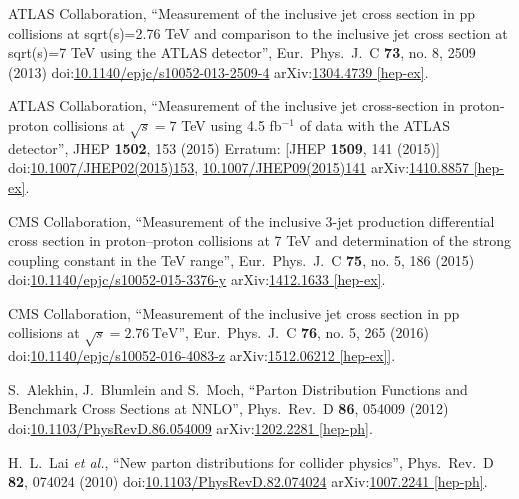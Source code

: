 \begin{thebibliography}{99}


ATLAS Collaboration, ``Measurement of the inclusive jet cross section in pp collisions at sqrt(s)=2.76 TeV and comparison to the inclusive jet cross section at sqrt(s)=7 TeV using the ATLAS detector'', Eur.\ Phys.\ J.\ C {\bf 73}, no. 8, 2509 (2013) doi:\href{http://dx.doi.org/10.1140/epjc/s10052-013-2509-4}{10.1140/epjc/s10052-013-2509-4} arXiv:\href{https://arxiv.org/abs/1304.4739}{1304.4739 [hep-ex]}.
 
ATLAS Collaboration, ``Measurement of the inclusive jet cross-section in proton-proton collisions at $ \sqrt{s}=7 $ TeV using 4.5 fb$^{-1}$ of data with the ATLAS detector'', JHEP {\bf 1502}, 153 (2015) Erratum: [JHEP {\bf 1509}, 141 (2015)] doi:\href{http://dx.doi.org/10.1007/JHEP02(2015)153}{10.1007/JHEP02(2015)153}, \href{http://dx.doi.org/10.1007/JHEP09(2015)141}{10.1007/JHEP09(2015)141} arXiv:\href{https://arxiv.org/abs/1410.8857}{1410.8857 [hep-ex]}.

CMS Collaboration, ``Measurement of the inclusive 3-jet production differential cross section in proton–proton collisions at 7 TeV and determination of the strong coupling constant in the TeV range'', Eur.\ Phys.\ J.\ C {\bf 75}, no. 5, 186 (2015) doi:\href{http://dx.doi.org/10.1140/epjc/s10052-015-3376-y}{10.1140/epjc/s10052-015-3376-y} arXiv:\href{https://arxiv.org/abs/1412.1633}{1412.1633 [hep-ex]}.

CMS Collaboration, ``Measurement of the inclusive jet cross section in pp collisions at $\sqrt{s} = 2.76\,\text {TeV}$'', Eur.\ Phys.\ J.\ C {\bf 76}, no. 5, 265 (2016) doi:\href{http://dx.doi.org/10.1140/epjc/s10052-016-4083-z}{10.1140/epjc/s10052-016-4083-z} arXiv:\href{https://arxiv.org/abs/1512.06212}{1512.06212 [hep-ex]]}.

S.~Alekhin, J.~Blumlein and S.~Moch, ``Parton Distribution Functions and Benchmark Cross Sections at NNLO'', Phys.\ Rev.\ D {\bf 86}, 054009 (2012) doi:\href{http://dx.doi.org/10.1103/PhysRevD.86.054009}{10.1103/PhysRevD.86.054009} arXiv:\href{https://arxiv.org/abs/1202.2281}{1202.2281 [hep-ph]}.

H.~L.~Lai {\it et al.}, ``New parton distributions for collider physics'', Phys.\ Rev.\ D {\bf 82}, 074024 (2010) doi:\href{http://dx.doi.org/10.1103/PhysRevD.82.074024}{10.1103/PhysRevD.82.074024} arXiv:\href{https://arxiv.org/abs/1007.2241}{1007.2241 [hep-ph]}.


\end{thebibliography}
